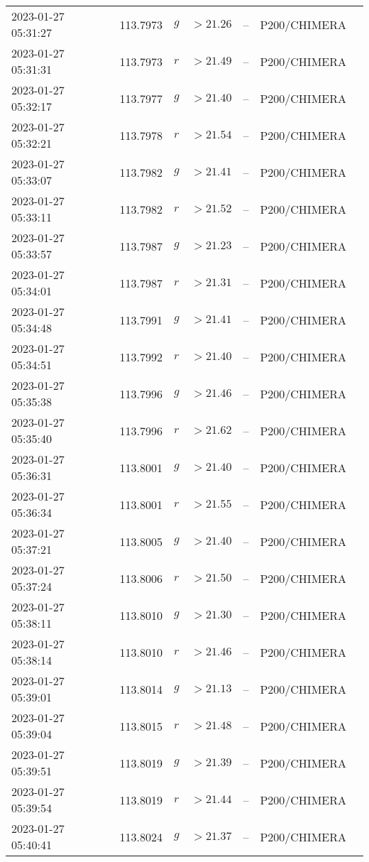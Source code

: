 \documentclass{nature_plusfigure}
\begin{document}
\begin{supplement}
\begin{center}
\begin{longtable}{lllllll}
2023-01-27 05:31:27 & 113.7973 & $g$ & $>21.26$ & -- & P200/CHIMERA &  \\ 
2023-01-27 05:31:31 & 113.7973 & $r$ & $>21.49$ & -- & P200/CHIMERA &  \\ 
2023-01-27 05:32:17 & 113.7977 & $g$ & $>21.40$ & -- & P200/CHIMERA &  \\ 
2023-01-27 05:32:21 & 113.7978 & $r$ & $>21.54$ & -- & P200/CHIMERA &  \\ 
2023-01-27 05:33:07 & 113.7982 & $g$ & $>21.41$ & -- & P200/CHIMERA &  \\ 
2023-01-27 05:33:11 & 113.7982 & $r$ & $>21.52$ & -- & P200/CHIMERA &  \\ 
2023-01-27 05:33:57 & 113.7987 & $g$ & $>21.23$ & -- & P200/CHIMERA &  \\ 
2023-01-27 05:34:01 & 113.7987 & $r$ & $>21.31$ & -- & P200/CHIMERA &  \\ 
2023-01-27 05:34:48 & 113.7991 & $g$ & $>21.41$ & -- & P200/CHIMERA &  \\ 
2023-01-27 05:34:51 & 113.7992 & $r$ & $>21.40$ & -- & P200/CHIMERA &  \\ 
2023-01-27 05:35:38 & 113.7996 & $g$ & $>21.46$ & -- & P200/CHIMERA &  \\ 
2023-01-27 05:35:40 & 113.7996 & $r$ & $>21.62$ & -- & P200/CHIMERA &  \\ 
2023-01-27 05:36:31 & 113.8001 & $g$ & $>21.40$ & -- & P200/CHIMERA &  \\ 
2023-01-27 05:36:34 & 113.8001 & $r$ & $>21.55$ & -- & P200/CHIMERA &  \\ 
2023-01-27 05:37:21 & 113.8005 & $g$ & $>21.40$ & -- & P200/CHIMERA &  \\ 
2023-01-27 05:37:24 & 113.8006 & $r$ & $>21.50$ & -- & P200/CHIMERA &  \\ 
2023-01-27 05:38:11 & 113.8010 & $g$ & $>21.30$ & -- & P200/CHIMERA &  \\ 
2023-01-27 05:38:14 & 113.8010 & $r$ & $>21.46$ & -- & P200/CHIMERA &  \\ 
2023-01-27 05:39:01 & 113.8014 & $g$ & $>21.13$ & -- & P200/CHIMERA &  \\ 
2023-01-27 05:39:04 & 113.8015 & $r$ & $>21.48$ & -- & P200/CHIMERA &  \\ 
2023-01-27 05:39:51 & 113.8019 & $g$ & $>21.39$ & -- & P200/CHIMERA &  \\ 
2023-01-27 05:39:54 & 113.8019 & $r$ & $>21.44$ & -- & P200/CHIMERA &  \\ 
2023-01-27 05:40:41 & 113.8024 & $g$ & $>21.37$ & -- & P200/CHIMERA &  \\ 

\end{longtable}
\end{center}
\end{supplement}
\end{document}
